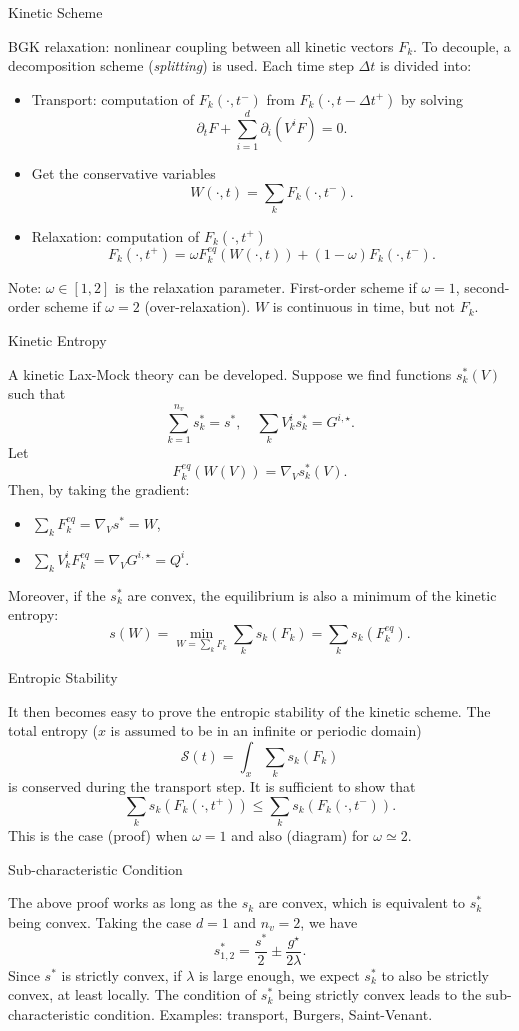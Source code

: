 \documentclass[english]{beamer}
\begin{document}
\begin{frame}{Kinetic Scheme}

BGK relaxation: nonlinear coupling between all kinetic vectors $F_{k}$. To decouple, a decomposition scheme (\emph{splitting}) is used. Each time step $\Delta t$ is divided into:
\begin{itemize}
\item Transport: computation of $F_{k}(\cdot,t{{}^-})$ from $F_{k}(\cdot,t-\Delta t^{+})$ by solving
\[
\partial_{t}F+\sum_{i=1}^{d}\partial_{i}\left(V^{i}F\right)=0.
\]
\item Get the conservative variables
\[
W(\cdot,t)=\sum_{k}F_{k}(\cdot,t^{-}).
\]
\item Relaxation: computation of $F_{k}(\cdot,t^{+})$
\[
F_{k}(\cdot,t^{+})=\omega F_{k}^{eq}(W(\cdot,t))+(1-\omega)F_{k}(\cdot,t^{-}).
\]
\end{itemize}
Note: $\omega\in[1,2]$ is the relaxation parameter. First-order scheme if $\omega=1$, second-order scheme if $\omega=2$ (over-relaxation). $W$ is continuous in time, but not $F_{k}$.
\end{frame}
%
\begin{frame}{Kinetic Entropy}

A kinetic Lax-Mock theory can be developed. Suppose we find functions $s_{k}^{*}(V)$ such that
\[
\sum_{k=1}^{n_{v}}s_{k}^{*}=s^{*},\quad\sum_{k}V_{k}^{i}s_{k}^{*}=G^{i,\star}.
\]
Let
\[
F_{k}^{eq}(W(V))=\nabla_{V}s_{k}^{*}(V).
\]
Then, by taking the gradient:
\begin{itemize}
\item $\sum_{k}F_{k}^{eq}=\nabla_{V}s^{*}=W$, 
\item $\sum_{k}V_{k}^{i}F_{k}^{eq}=\nabla_{V}G^{i,\star}=Q^{i}$.
\end{itemize}
Moreover, if the $s_{k}^{*}$ are convex, the equilibrium is also a minimum of the kinetic entropy:
\[
s(W)=\min_{W=\sum_{k}F_{k}}\sum_{k}s_{k}(F_{k})=\sum_{k}s_{k}(F_{k}^{eq}).
\]
\end{frame}
%
\begin{frame}{Entropic Stability}

It then becomes easy to prove the entropic stability of the kinetic scheme. The total entropy ($x$ is assumed to be in an infinite or periodic domain)
\[
\mathcal{S}(t)=\int_{x}\sum_{k}s_{k}(F_{k})
\]
is conserved during the transport step. It is sufficient to show that
\[
\sum_{k}s_{k}(F_{k}(\cdot,t^{+}))\leq\sum_{k}s_{k}(F_{k}(\cdot,t^{-})).
\]
This is the case (proof) when $\omega=1$ and also (diagram) for $\omega\simeq2$.
\end{frame}
%
\begin{frame}{Sub-characteristic Condition}

The above proof works as long as the $s_{k}$ are convex, which is equivalent to $s_{k}^{*}$ being convex. Taking the case $d=1$ and $n_{v}=2$, we have
\[
s_{1,2}^{*}=\frac{s^{*}}{2}\pm\frac{g^{\star}}{2\lambda}.
\]
Since $s^{*}$ is strictly convex, if $\lambda$ is large enough, we expect $s_{k}^{*}$ to also be strictly convex, at least locally. The condition of $s_{k}^{*}$ being strictly convex leads to the sub-characteristic condition. Examples: transport, Burgers, Saint-Venant. 
\end{frame}
%
\end{document}

